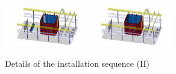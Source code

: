 \begin{figure}[!t]
\includegraphics[width=0.32\textwidth]{./Figures/assembly_sequence_11_07/34.png}
\includegraphics[width=0.32\textwidth]{./Figures/assembly_sequence_11_07/35.png}
\caption{Details of the installation sequence (II) }
\label{fig:Ds20kInstallSequence2}
\end{figure}

